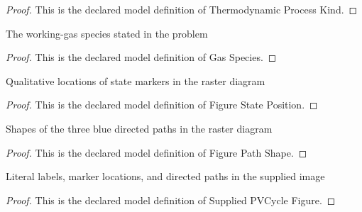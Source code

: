\begin{proof}
  This is the declared model definition of Thermodynamic Process Kind.
\end{proof}
\begin{definition}
  \label{def:physics:phyx-mini-0351:phyxminiproblems-problemphyxmini0351-gasspecies}
  The working-gas species stated in the problem
\end{definition}
\begin{proof}
  This is the declared model definition of Gas Species.
\end{proof}
\begin{definition}
  \label{def:physics:phyx-mini-0351:phyxminiproblems-problemphyxmini0351-figurestateposition}
  Qualitative locations of state markers in the raster diagram
\end{definition}
\begin{proof}
  This is the declared model definition of Figure State Position.
\end{proof}
\begin{definition}
  \label{def:physics:phyx-mini-0351:phyxminiproblems-problemphyxmini0351-figurepathshape}
  Shapes of the three blue directed paths in the raster diagram
\end{definition}
\begin{proof}
  This is the declared model definition of Figure Path Shape.
\end{proof}
\begin{definition}
  \label{def:physics:phyx-mini-0351:phyxminiproblems-problemphyxmini0351-suppliedpvcyclefigure}
  Literal labels, marker locations, and directed paths in the supplied image
\end{definition}
\begin{proof}
  This is the declared model definition of Supplied PVCycle Figure.
\end{proof}
